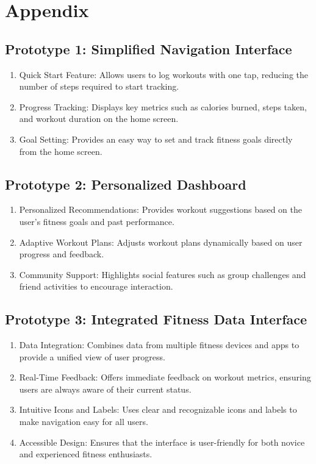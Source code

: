 \documentclass[
	letterpaper, %
]{jdf}
\begin{document}
\section{Appendix}
\subsection{Prototype 1: Simplified Navigation Interface}
\begin{enumerate}
        \item Quick Start Feature: Allows users to log workouts with one tap, reducing the number of steps required to start tracking.
        \item Progress Tracking: Displays key metrics such as calories burned, steps taken, and workout duration on the home screen.
        \item Goal Setting: Provides an easy way to set and track fitness goals directly from the home screen.
\end{enumerate}

\subsection{Prototype 2: Personalized Dashboard}
\begin{enumerate}
        \item Personalized Recommendations: Provides workout suggestions based on the user's fitness goals and past performance.
        \item Adaptive Workout Plans: Adjusts workout plans dynamically based on user progress and feedback.
        \item Community Support: Highlights social features such as group challenges and friend activities to encourage interaction.
\end{enumerate}

\subsection{Prototype 3: Integrated Fitness Data Interface}
\begin{enumerate}
        \item Data Integration: Combines data from multiple fitness devices and apps to provide a unified view of user progress.
        \item Real-Time Feedback: Offers immediate feedback on workout metrics, ensuring users are always aware of their current status.
        \item Intuitive Icons and Labels: Uses clear and recognizable icons and labels to make navigation easy for all users.
        \item Accessible Design: Ensures that the interface is user-friendly for both novice and experienced fitness enthusiasts.
\end{enumerate}

\newpage

\newpage
\end{document}
